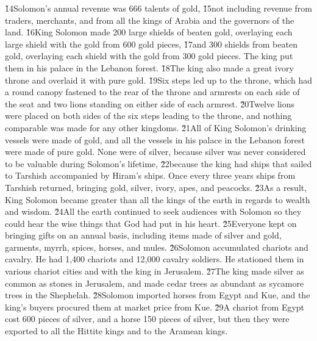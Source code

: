 \v{14}Solomon's annual revenue was 666 talents of gold, \v{15}not including revenue from traders, merchants, and from all the kings of Arabia and the governors of the land. \v{16}King Solomon made 200 large shields of beaten gold, overlaying each large shield with the gold from 600 gold pieces, \v{17}and 300 shields from beaten gold, overlaying each shield with the gold from 300 gold pieces. The king put them in his palace in the Lebanon forest. \v{18}The king also made a great ivory throne and overlaid it with pure gold. \v{19}Six steps led up to the throne, which had a round canopy fastened to the rear of the throne and armrests on each side of the seat and two lions standing on either side of each armrest. \v{20}Twelve lions were placed on both sides of the six steps leading to the throne, and nothing comparable was made for any other kingdoms. \v{21}All of King Solomon's drinking vessels were made of gold, and all the vessels in his palace in the Lebanon forest were made of pure gold. None were of silver, because silver was never considered to be valuable during Solomon's lifetime, \v{22}because the king had ships that sailed to Tarshish accompanied by Hiram's ships. Once every three years ships from Tarshish returned, bringing gold, silver, ivory, apes, and peacocks. \v{23}As a result, King Solomon became greater than all the kings of the earth in regards to wealth and wisdom. \v{24}All the earth continued to seek audiences with Solomon so they could hear the wise things that God had put in his heart. \v{25}Everyone kept on bringing gifts on an annual basis, including items made of silver and gold, garments, myrrh, spices, horses, and mules. \v{26}Solomon accumulated chariots and cavalry. He had 1,400 chariots and 12,000 cavalry soldiers. He stationed them in various chariot cities and with the king in Jerusalem. \v{27}The king made silver as common as stones in Jerusalem, and made cedar trees as abundant as sycamore trees in the Shephelah. \v{28}Solomon imported horses from Egypt and Kue, and the king's buyers procured them at market price from Kue. \v{29}A chariot from Egypt cost 600 pieces of silver, and a horse 150 pieces of silver, but then they were exported to all the Hittite kings and to the Aramean kings.

